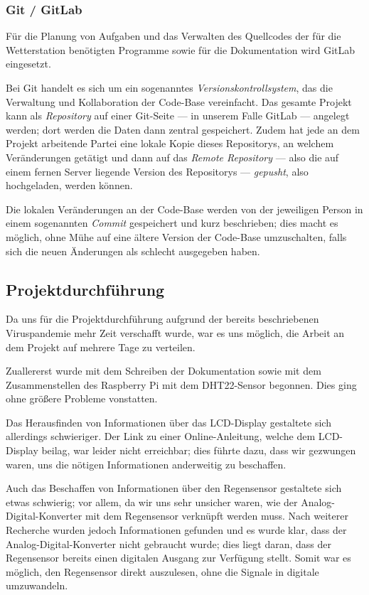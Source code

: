\documentclass[a4paper,12pt]{article}
\begin{document}
\subsubsection{Git / GitLab}
Für die Planung von Aufgaben und das Verwalten des Quellcodes der für die Wetterstation benötigten Programme sowie für die Dokumentation wird GitLab eingesetzt.

Bei Git handelt es sich um ein sogenanntes \textit{Versionskontrollsystem}, das die Verwaltung und Kollaboration der Code-Base vereinfacht. 
Das gesamte Projekt kann als \textit{Repository} auf einer Git-Seite — in unserem Falle GitLab — angelegt werden; dort werden die Daten dann zentral gespeichert.
Zudem hat jede an dem Projekt arbeitende Partei eine lokale Kopie dieses Repositorys, an welchem Veränderungen getätigt und dann auf das \textit{Remote Repository} — also die auf einem fernen Server liegende Version des Repositorys — \textit{gepusht}, also hochgeladen, werden können.

Die lokalen Veränderungen an der Code-Base werden von der jeweiligen Person in einem sogenannten \textit{Commit} gespeichert und kurz beschrieben; dies macht es möglich, ohne Mühe auf eine ältere Version der Code-Base umzuschalten, falls sich die neuen Änderungen als schlecht ausgegeben haben.

\subsection{Projektdurchführung}
Da uns für die Projektdurchführung aufgrund der bereits beschriebenen Viruspandemie mehr Zeit verschafft wurde, war es uns möglich, die Arbeit an dem Projekt auf mehrere Tage zu verteilen. 

Zuallererst wurde mit dem Schreiben der Dokumentation sowie mit dem Zusammenstellen des Raspberry Pi mit dem DHT22-Sensor begonnen. Dies ging ohne größere Probleme vonstatten.

Das Herausfinden von Informationen über das LCD-Display gestaltete sich allerdings schwieriger. Der Link zu einer Online-Anleitung, welche dem LCD-Display beilag, war leider nicht erreichbar; dies führte dazu, dass wir gezwungen waren, uns die nötigen Informationen anderweitig zu beschaffen.

Auch das Beschaffen von Informationen über den Regensensor gestaltete sich etwas schwierig; vor allem, da wir uns sehr unsicher waren, wie der Analog-Digital-Konverter mit dem Regensensor verknüpft werden muss. Nach weiterer Recherche wurden jedoch Informationen gefunden und es wurde klar, dass der Analog-Digital-Konverter nicht gebraucht wurde; dies liegt daran, dass der Regensensor bereits einen digitalen Ausgang zur Verfügung stellt. Somit war es möglich, den Regensensor direkt auszulesen, ohne die Signale in digitale umzuwandeln.
\end{document}
